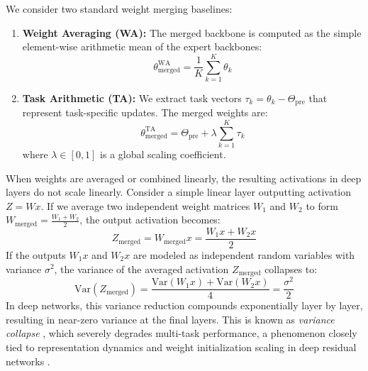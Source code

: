 \documentclass{article}
\theoremstyle{plain}
\theoremstyle{definition}
\theoremstyle{remark}
\begin{document}
We consider two standard weight merging baselines:
\begin{enumerate}
    \item \textbf{Weight Averaging (WA):} The merged backbone is computed as the simple element-wise arithmetic mean of the expert backbones:
    \begin{equation}
      \theta_{\text{merged}}^{\text{WA}} = \frac{1}{K} \sum_{k=1}^K \theta_k
    \end{equation}
    \item \textbf{Task Arithmetic (TA):} We extract task vectors $\tau_k = \theta_k - \Theta_{\text{pre}}$ that represent task-specific updates. The merged weights are:
    \begin{equation}
      \theta_{\text{merged}}^{\text{TA}} = \Theta_{\text{pre}} + \lambda \sum_{k=1}^K \tau_k
    \end{equation}
    where $\lambda \in [0, 1]$ is a global scaling coefficient.
\end{enumerate}

When weights are averaged or combined linearly, the resulting activations in deep layers do not scale linearly. Consider a simple linear layer outputting activation $Z = W x$. If we average two independent weight matrices $W_1$ and $W_2$ to form $W_{\text{merged}} = \frac{W_1+W_2}{2}$, the output activation becomes:
\begin{equation}
  Z_{\text{merged}} = W_{\text{merged}} x = \frac{W_1 x + W_2 x}{2}
\end{equation}
If the outputs $W_1 x$ and $W_2 x$ are modeled as independent random variables with variance $\sigma^2$, the variance of the averaged activation $Z_{\text{merged}}$ collapses to:
\begin{equation}
  \text{Var}(Z_{\text{merged}}) = \frac{\text{Var}(W_1 x) + \text{Var}(W_2 x)}{4} = \frac{\sigma^2}{2}
\end{equation}
In deep networks, this variance reduction compounds exponentially layer by layer, resulting in near-zero variance at the final layers. This is known as \textit{variance collapse} \cite{jordan2022repair}, which severely degrades multi-task performance, a phenomenon closely tied to representation dynamics and weight initialization scaling in deep residual networks \cite{he2015delving, he2016identity, glorot2010understanding}.
\end{document}
